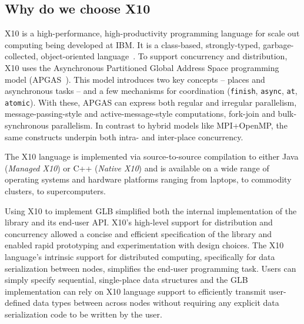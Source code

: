 \subsection{Why do we choose X10}

X10 is a high-performance, high-productivity programming language for
scale out computing being developed at IBM. It is a class-based,
strongly-typed, garbage-collected, object-oriented
language~\cite{x10-concur05,x10}.  To support concurrency and
distribution, X10 uses the Asynchronous Partitioned Global Address
Space programming model (APGAS~\cite{Saraswat:AMP10}). This model
introduces two key concepts -- places and asynchronous tasks -- and a
few mechanisms for coordination ({\tt finish}, {\tt async},
{\tt at}, {\tt atomic}).  With these, APGAS can express both
regular and irregular parallelism, message-passing-style and
active-message-style computations, fork-join and bulk-synchronous
parallelism.  In contrast to hybrid models like MPI+OpenMP, the same
constructs underpin both intra- and inter-place concurrency.

The X10 language is implemented via source-to-source compilation to
either Java ({\em Managed X10}) or C++ ({\em Native X10}) and is
available on a wide range of operating systems and hardware platforms
ranging from laptops, to commodity clusters, to supercomputers.

Using X10 to implement GLB simplified both the internal implementation
of the library and its end-user API.  X10's high-level support for
distribution and concurrency allowed a concise and efficient
specification of the library and enabled rapid prototyping and
experimentation with design choices.  The X10 language's intrinsic
support for distributed computing, specifically for data serialization
between nodes, simplifies the end-user programming task. Users can
simply specify sequential, single-place data structures and the GLB
implementation can rely on X10 language support to efficiently transmit
user-defined data types between across nodes without requiring any
explicit data serialization code to be written by the user.
